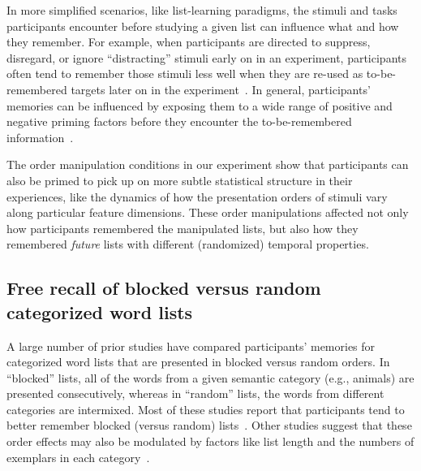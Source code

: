 \documentclass[11pt]{article}
\begin{document}
In more simplified scenarios, like list-learning paradigms, the stimuli and
tasks participants encounter before studying a given list can influence what
and how they remember. For example, when participants are directed to suppress,
disregard, or ignore ``distracting'' stimuli early on in an experiment,
participants often tend to remember those stimuli less well when they are
re-used as to-be-remembered targets later on in the experiment~\citep{Tipp85}.
In general, participants' memories can be influenced by exposing them to a wide
range of positive and negative priming factors before they encounter the
to-be-remembered information~\citep{BaloEtal92, ClayChat89, Donn88, FlexTulv82,
GottEtal12, HuanEtal04, Hube08, HubeEtal01, McNa94, Neel77, Rabi86, TulvScha91,
WatkEtal92, WiggMart98}.

The order manipulation conditions in our experiment show that participants can
also be primed to pick up on more subtle statistical structure in their
experiences, like the dynamics of how the presentation orders of stimuli vary
along particular feature dimensions. These order manipulations affected not
only how participants remembered the manipulated lists, but also how they
remembered \textit{future} lists with different (randomized) temporal
properties.

\subsection*{Free recall of blocked versus random categorized word lists}

A large number of prior studies have compared participants' memories for
categorized word lists that are presented in blocked versus random orders. In
``blocked'' lists, all of the words from a given semantic category (e.g.,
animals) are presented consecutively, whereas in ``random'' lists, the words
from different categories are intermixed. Most of these studies report that
participants tend to better remember blocked (versus random)
lists~\citep{CofeEtal66, DAgo69, Dall64, Shap70, ShapPalm70, Kint70,
BoweEtal68, BoweEtal69, LuekEtal71, Puff74}. Other studies suggest that these order
effects may also be modulated by factors like list length and the numbers of
exemplars in each category~\citep[e.g.,][]{BorgMang72}.
\end{document}
